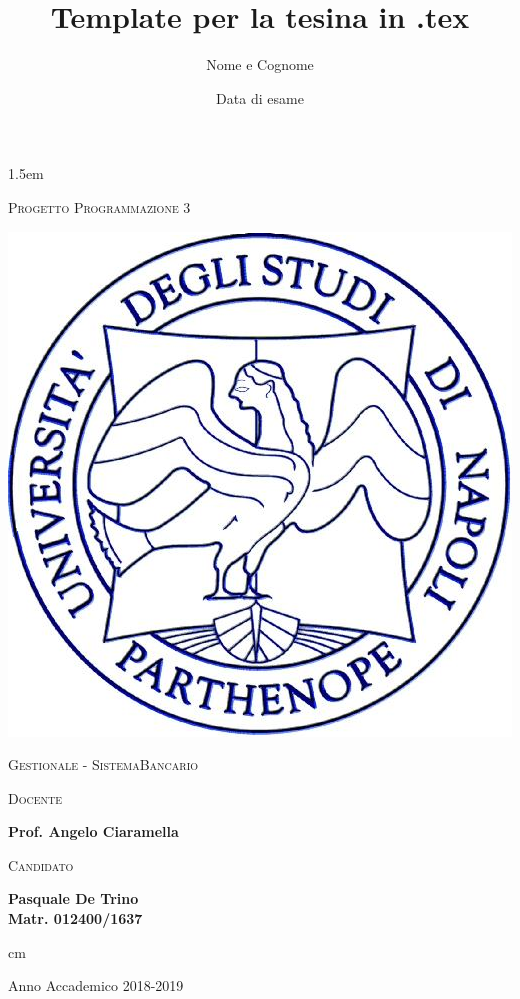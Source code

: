 \documentclass[12pt,italian,a4paper,oneside,openright]{book}
\title{Template per la tesina in .tex}
\author{Nome e Cognome}
\date{Data di esame}
\begin{document}

\baselineskip 1.5em

{ \thispagestyle{empty}


\vskip 1cm \large \centerline{\textsc{Progetto Programmazione 3}}

\begin{center}
\includegraphics[scale=0.50]{logo_parthenope.png}
\end{center}

\vskip 0.5cm

\large \centerline {\textsc{Gestionale - SistemaBancario}}

\vskip 0.5cm

\vskip 4.5cm


\large
\begin{minipage}[t]{7cm}
\textsc{Docente}

\textbf{Prof. Angelo Ciaramella}\newline

\end{minipage}
\hfill
\begin{minipage}[t]{5.5cm}
\textsc{Candidato}

\textbf{Pasquale De Trino}
\textbf{\\Matr. 012400/1637}

\end{minipage}

 cm \Large \centerline {Anno Accademico 2018-2019}
\vfill \eject}


\tableofcontents

\newpage





\newpage
\pagestyle{plain}

%
\end{document}
